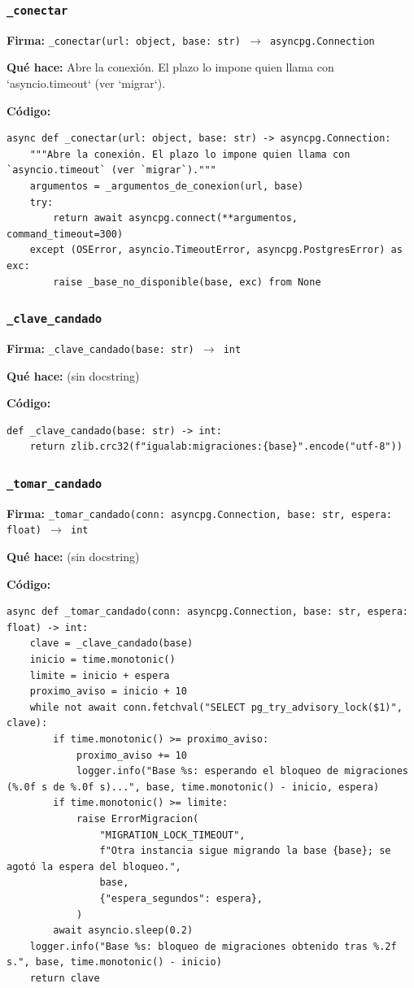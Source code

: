 \documentclass[11pt,a4paper]{article}
\begin{document}
\subsubsection*{\texttt{\_conectar}}
\textbf{Firma:} \texttt{\_conectar(url: object, base: str) $\rightarrow$ asyncpg.Connection}

\textbf{Qué hace:} Abre la conexión. El plazo lo impone quien llama con `asyncio.timeout` (ver `migrar`).

\textbf{Código:}
\begin{lstlisting}
async def _conectar(url: object, base: str) -> asyncpg.Connection:
    """Abre la conexión. El plazo lo impone quien llama con `asyncio.timeout` (ver `migrar`)."""
    argumentos = _argumentos_de_conexion(url, base)
    try:
        return await asyncpg.connect(**argumentos, command_timeout=300)
    except (OSError, asyncio.TimeoutError, asyncpg.PostgresError) as exc:
        raise _base_no_disponible(base, exc) from None
\end{lstlisting}

\subsubsection*{\texttt{\_clave\_candado}}
\textbf{Firma:} \texttt{\_clave\_candado(base: str) $\rightarrow$ int}

\textbf{Qué hace:} (sin docstring)

\textbf{Código:}
\begin{lstlisting}
def _clave_candado(base: str) -> int:
    return zlib.crc32(f"igualab:migraciones:{base}".encode("utf-8"))
\end{lstlisting}

\subsubsection*{\texttt{\_tomar\_candado}}
\textbf{Firma:} \texttt{\_tomar\_candado(conn: asyncpg.Connection, base: str, espera: float) $\rightarrow$ int}

\textbf{Qué hace:} (sin docstring)

\textbf{Código:}
\begin{lstlisting}
async def _tomar_candado(conn: asyncpg.Connection, base: str, espera: float) -> int:
    clave = _clave_candado(base)
    inicio = time.monotonic()
    limite = inicio + espera
    proximo_aviso = inicio + 10
    while not await conn.fetchval("SELECT pg_try_advisory_lock($1)", clave):
        if time.monotonic() >= proximo_aviso:
            proximo_aviso += 10
            logger.info("Base %s: esperando el bloqueo de migraciones (%.0f s de %.0f s)...", base, time.monotonic() - inicio, espera)
        if time.monotonic() >= limite:
            raise ErrorMigracion(
                "MIGRATION_LOCK_TIMEOUT",
                f"Otra instancia sigue migrando la base {base}; se agotó la espera del bloqueo.",
                base,
                {"espera_segundos": espera},
            )
        await asyncio.sleep(0.2)
    logger.info("Base %s: bloqueo de migraciones obtenido tras %.2f s.", base, time.monotonic() - inicio)
    return clave
\end{lstlisting}
\end{document}
